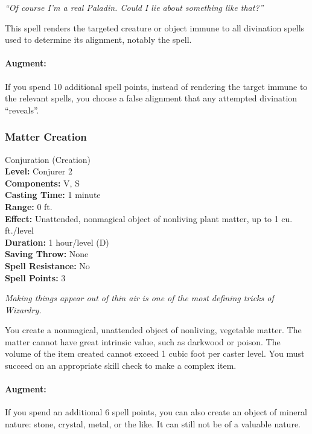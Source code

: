 \emph{``Of course I'm a real Paladin. Could I lie about something like that?''}

This spell renders the targeted creature or object immune to all divination spells used to determine its alignment, notably the  spell.

\paragraph{Augment:} If you spend 10 additional spell points, instead of rendering the target immune to the relevant spells, you choose a false alignment that any attempted divination ``reveals''.
\subsubsection{Matter Creation}
\label{Spell:MatterCreation}
Conjuration (Creation)
\\ \textbf{Level:} Conjurer 2
\\ \textbf{Components:} V, S
\\ \textbf{Casting Time:} 1 minute
\\ \textbf{Range:} 0 ft.
\\ \textbf{Effect:} Unattended, nonmagical object of nonliving plant matter, up to 1 cu. ft./level
\\ \textbf{Duration:} 1 hour/level (D)
\\ \textbf{Saving Throw:} None
\\ \textbf{Spell Resistance:} No
\\ \textbf{Spell Points:} 3

\emph{Making things appear out of thin air is one of the most defining tricks of Wizardry.}

You create a nonmagical, unattended object of nonliving, vegetable matter.
The matter cannot have great intrinsic value, such as darkwood or poison.
The volume of the item created cannot exceed 1 cubic foot per caster level. 
You must succeed on an appropriate skill check to make a complex item.


\paragraph{Augment:} If you spend an additional 6 spell points, you can also create an object of mineral nature: stone, crystal, metal, or the like.
It can still not be of a valuable nature.
